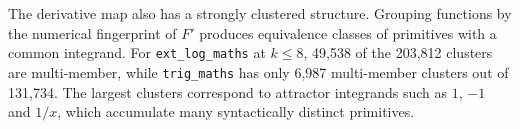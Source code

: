 \documentclass[preprint,12pt,authoryear]{elsarticle}
\newcommand{\dd}{{\rm d}}
\newcommand{\hd}[1]{{\color{red}\textbf{[HD: #1]}}}
\begin{document}
The derivative map also has a strongly clustered structure. Grouping functions by the numerical fingerprint of $F'$ produces equivalence classes of primitives with a common integrand. For \texttt{ext\_log\_maths} at $k \leq 8$, 49{,}538 of the 203{,}812 clusters are multi-member, while \texttt{trig\_maths} has only 6{,}987 multi-member clusters out of 131{,}734. The largest clusters correspond to attractor integrands such as $1$, $-1$ and $1/x$, which accumulate many syntactically distinct primitives.



\end{document}
